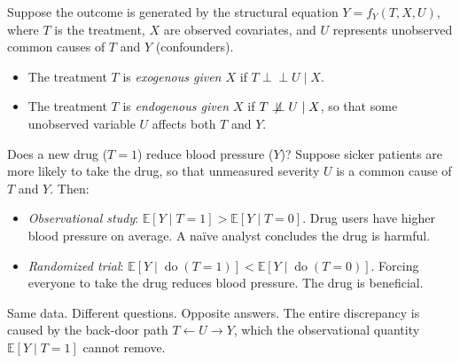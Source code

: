 \documentclass[
  a4paper,
]{book}
\providecommand{\tightlist}{%
  \setlength{\itemsep}{0pt}\setlength{\parskip}{0pt}}
\newcommand{\doop}{\operatorname{do}}
\newcommand{\indep}{\perp\!\!\!\perp}
\newcommand{\nindep}{\centernot{\indep}}
\newcommand{\E}{\mathbb{E}}
\begin{document}
\begin{tcolorbox}[enhanced jigsaw, arc=.35mm, bottomrule=.15mm, bottomtitle=1mm, breakable, colback=white, colbacktitle=quarto-callout-note-color!10!white, colframe=quarto-callout-note-color-frame, coltitle=black, left=2mm, leftrule=.75mm, opacityback=0, opacitybacktitle=0.6, rightrule=.15mm, title={Definition: Exogeneity and Endogeneity}, titlerule=0mm, toprule=.15mm, toptitle=1mm]

Suppose the outcome is generated by the structural equation
\(Y = f_Y(T, X, U)\), where \(T\) is the treatment, \(X\) are observed
covariates, and \(U\) represents unobserved common causes of \(T\) and
\(Y\) (confounders).

\begin{itemize}
\tightlist
\item
  The treatment \(T\) is \emph{exogenous given \(X\)} if
  \(T \indep U \mid X\).
\item
  The treatment \(T\) is \emph{endogenous given \(X\)} if
  \(T \nindep U \mid X\), so that some unobserved variable \(U\) affects
  both \(T\) and \(Y\).
\end{itemize}

\end{tcolorbox}

\begin{tcolorbox}[enhanced jigsaw, arc=.35mm, bottomrule=.15mm, bottomtitle=1mm, breakable, colback=white, colbacktitle=quarto-callout-note-color!10!white, colframe=quarto-callout-note-color-frame, coltitle=black, left=2mm, leftrule=.75mm, opacityback=0, opacitybacktitle=0.6, rightrule=.15mm, title={Example: Drug Trial with Unmeasured Severity}, titlerule=0mm, toprule=.15mm, toptitle=1mm]

Does a new drug (\(T=1\)) reduce blood pressure (\(Y\))? Suppose sicker
patients are more likely to take the drug, so that unmeasured severity
\(U\) is a common cause of \(T\) and \(Y\). Then:

\begin{itemize}
\tightlist
\item
  \emph{Observational study}: \(\E[Y \mid T{=}1] > \E[Y \mid T{=}0]\).
  Drug users have higher blood pressure on average. A naïve analyst
  concludes the drug is harmful.
\item
  \emph{Randomized trial}:
  \(\E[Y \mid \doop(T{=}1)] < \E[Y \mid \doop(T{=}0)]\). Forcing
  everyone to take the drug reduces blood pressure. The drug is
  beneficial.
\end{itemize}

Same data. Different questions. Opposite answers. The entire discrepancy
is caused by the back-door path \(T \leftarrow U \to Y\), which the
observational quantity \(\E[Y \mid T{=}1]\) cannot remove.

\end{tcolorbox}
\end{document}
